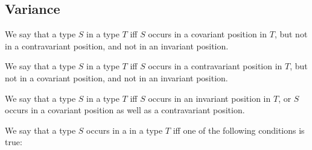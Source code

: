 \documentclass[makeidx]{article}
\begin{document}









\subsection{Variance}

\LMHash{}%
We say that a type $S$  in a type $T$ if{}f
$S$ occurs in a covariant position in $T$,
but not in a contravariant position,
and not in an invariant position.

\LMHash{}%
We say that a type $S$  in a type $T$ if{}f
$S$ occurs in a contravariant position in $T$,
but not in a covariant position,
and not in an invariant position.

\LMHash{}%
We say that a type $S$  in a type $T$ if{}f
$S$ occurs in an invariant position in $T$,
or $S$ occurs in a covariant position as well as a contravariant position.

\LMHash{}%
We say that a type $S$ occurs in a  in a type $T$
if{}f one of the following conditions is true:
\end{document}
